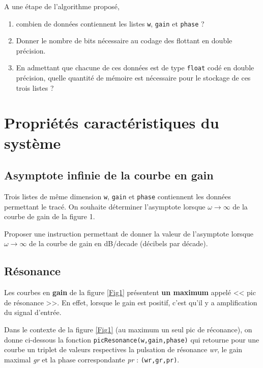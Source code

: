  
\question{} A une étape de l'algorithme proposé, 
\begin{enumerate}
\item combien de données contiennent les listes \texttt{w}, \texttt{gain} et \texttt{phase} ?
\item Donner le nombre de bits nécessaire au codage des flottant en double précision.
\item En admettant que chacune de ces données est de type \texttt{float} codé en double précision, quelle quantité de mémoire est nécessaire pour le stockage de ces trois listes ?
\end{enumerate}

 


 \section*{Propriétés caractéristiques du système}

\subsection*{Asymptote infinie de la courbe en gain}

Trois listes de même dimension \texttt{w}, \texttt{gain} et \texttt{phase} contiennent les données permettant le tracé.
On souhaite déterminer l'asymptote lorsque $\omega \to \infty$ de la courbe de gain de la figure 1. 

 
\question{} Proposer une instruction permettant de donner la valeur de l'asymptote lorsque $\omega \to \infty$ de la courbe de gain en dB/decade (décibels par décade).
 

\subsection*{Résonance}

Les courbes en \textbf{gain} de la figure \ref{Fig1} présentent \textbf{un maximum} appelé << pic de résonance >>. En effet, lorsque le gain est positif, c'est qu'il y a amplification du signal d'entrée.

Dans le contexte de la figure \ref{Fig1} (au maximum un seul pic de réconance), on donne ci-dessous la fonction \texttt{picResonance(w,gain,phase)} qui retourne pour une courbe un triplet de valeurs respectives la pulsation de résonance \textit{wr}, le gain maximal \textit{gr} et la phase correspondante \textit{pr} : \texttt{(wr,gr,pr)}.

%

